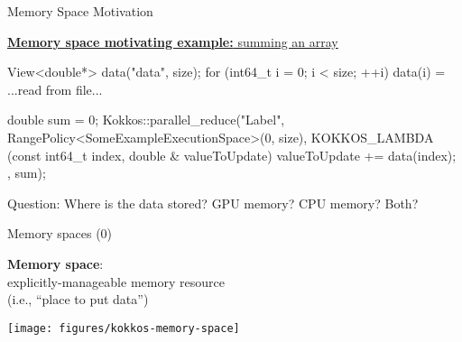 \ifmedium
\begin{frame}[fragile]{Memory Space Motivation}

  \ul{\textbf{Memory space motivating example:} summing an array}

  \begin{code}[linebackgroundcolor={
        \btLstHL<3-4>{3,10}{red!20}
      },
      keywords={}]
View<double*> data("data", size);
for (int64_t i = 0; i < size; ++i) {
  data(i) = ...read from file...
}

double sum = 0;
Kokkos::parallel_reduce("Label",
  RangePolicy<SomeExampleExecutionSpace>(0, size),
  KOKKOS_LAMBDA (const int64_t index, double & valueToUpdate) {
    valueToUpdate += data(index);
  },
  sum);
  \end{code}

  \pause
  \vspace{10pt}

  Question: Where is the data stored? GPU memory?  CPU memory?  Both?

  \pause
  \pause
  \vspace{10pt}


\end{frame}
\fi


\begin{frame}[fragile]{Memory spaces (0)}

  \begin{center}
  \textbf{Memory space}: \\
     explicitly-manageable memory resource  \\
     (i.e., ``place to put data'')
  \end{center}

  \vspace{-20pt}

  \begin{center}
    \texttt{[image: figures/kokkos-memory-space]}
  \end{center}

\end{frame}


